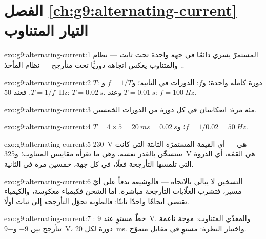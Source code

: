 \section*{الفصل \ref{ch:g9:alternating-current} --- التيار المتناوب}

\begin{solution}{exo:g9:alternating-current:1}
المستمرّ يسري دائمًا في جهة واحدة تحت  ثابت --- نظام
. والمتناوب يعكس اتجاهه دوريًّا تحت  متأرجح ---
نظام المأخذ.
\end{solution}

\begin{solution}{exo:g9:alternating-current:2}
$T$:  دورة كاملة واحدة؛ و$f$: الدورات في الثانية؛
و$f = 1/T$ و$T = 1/f$. فعند \qty{50}{Hz}: $T = \qty{0.02}{s}$.
وعند $T = \qty{0.01}{s}$: $f = \qty{100}{Hz}$.
\end{solution}

\begin{solution}{exo:g9:alternating-current:3}
مئة مرة: انعكاسان في كل دورة من الدورات الخمسين.
\end{solution}

\begin{solution}{exo:g9:alternating-current:4}
$T = 4 \times 5 = \qty{20}{ms} = \qty{0.02}{s}$؛ و$f = 1/0.02
= \qty{50}{Hz}$.
\end{solution}

\begin{solution}{exo:g9:alternating-current:5}
\qty{230}{V} هي  --- أي القيمة المستمرّة الثابتة
التي كانت ستسخّن بالقدر نفسه، وهي ما تقرأه مقاييس 
المتناوب؛ و\qty{325}{V} هي القمّة، أي الذروة التي تلمسها
التأرجحة فعلًا، في كل جهة، خمسين مرة في الثانية.
\end{solution}

\begin{solution}{exo:g9:alternating-current:6}
التسخين لا يبالي بالاتجاه --- فالوشيعة تدفأ على أيّ مسير،
فتشرب الغلّايات التأرجحة مباشرة. أما الشحن فكيمياء معكوسة،
والكيمياء تقتضي اتجاهًا واحدًا ثابتًا: فالطوبة تحوّل التأرجحة
إلى ثبات أولًا.
\end{solution}

\begin{solution}{exo:g9:alternating-current:7}
: خطّ مستوٍ عند \qty{9}{V}. والمغذّي المتناوب: موجة
ناعمة تتأرجح بين $+9$ و\qty{-9}{V}، دورة لكل \qty{20}{ms}.
واختبار النظرة: مستوٍ في مقابل متموّج.
\end{solution}

